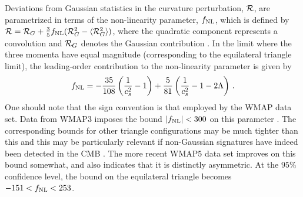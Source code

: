 Deviations from Gaussian statistics in the curvature perturbation, ${\cal{R}}$,
are parametrized in terms of the non-linearity parameter, 
$f_{\mathrm{NL}}$, which is defined by ${\cal{R}} = {\cal{R}}_G + \frac{3}{5} f_{\mathrm{NL}}  (
{\cal{R}}_G^2 -\langle {\cal{R}}_G^2 \rangle )$, where the 
quadratic component represents a convolution and 
${\cal{R}}_G$ denotes the Gaussian contribution \cite{maldacena}. In the limit  
where the three momenta have equal magnitude (corresponding to the equilateral  
triangle limit), the leading-order contribution to the non-linearity 
parameter is given by \cite{chenetal,lidser3}
% 
\begin{equation} 
\label{eq:fnldefn-dbiintro}
 f_{\mathrm{NL}} = -\frac{35}{108}\left(\frac{1}{c_s^2} -1 \right) +
\frac{5}{81}\left( \frac{1}{c_s^2} -1 -2\Lambda \right) \,.
\end{equation}
%  
One should note that the sign convention is that employed
by the WMAP data set.
Data from WMAP3 imposes the bound $|f_{\mathrm{NL}}| < 300$ on this parameter
\cite{spergel}. The corresponding bounds for other triangle configurations 
may be much tighter than this and this may be particularly relevant if 
non-Gaussian signatures have indeed been detected in the 
CMB \cite{Yadav:2007yy,crim}. The more recent WMAP5 data set
\cite{Komatsu:2008hk} improves on this bound somewhat, and
also indicates that it is distinctly asymmetric. At the $95 \%$ confidence level, the bound on the 
equilateral triangle becomes $-151 < f_{\mathrm{NL}} < 253$.


